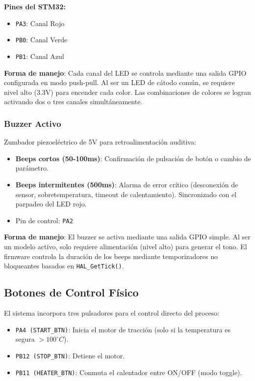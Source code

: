 \documentclass[12pt]{article}
\begin{document}
\textbf{Pines del STM32:}
\begin{itemize}
    \item \texttt{PA3}: Canal Rojo
    \item \texttt{PB0}: Canal Verde
    \item \texttt{PB1}: Canal Azul
\end{itemize}

\textbf{Forma de manejo}: Cada canal del LED se controla mediante una salida GPIO configurada en modo push-pull. Al ser un LED de cátodo común, se requiere nivel alto (3.3V) para encender cada color. Las combinaciones de colores se logran activando dos o tres canales simultáneamente.

\subsubsection{Buzzer Activo}
Zumbador piezoeléctrico de 5V para retroalimentación auditiva:
\begin{itemize}
    \item \textbf{Beeps cortos (50-100ms)}: Confirmación de pulsación de botón o cambio de parámetro.
    \item \textbf{Beeps intermitentes (500ms)}: Alarma de error crítico (desconexión de sensor, sobretemperatura, timeout de calentamiento). Sincronizado con el parpadeo del LED rojo.
    \item Pin de control: \texttt{PA2}
\end{itemize}

\textbf{Forma de manejo}: El buzzer se activa mediante una salida GPIO simple. Al ser un modelo activo, solo requiere alimentación (nivel alto) para generar el tono. El firmware controla la duración de los beeps mediante temporizadores no bloqueantes basados en \texttt{HAL\_GetTick()}.

\subsection{Botones de Control Físico}
El sistema incorpora tres pulsadores para el control directo del proceso:

\begin{itemize}
    \item \texttt{PA4 (START\_BTN)}: Inicia el motor de tracción (solo si la temperatura es segura $>100^\circ C$).
    \item \texttt{PB12 (STOP\_BTN)}: Detiene el motor.
    \item \texttt{PB11 (HEATER\_BTN)}: Conmuta el calentador entre ON/OFF (modo toggle).
\end{itemize}
\end{document}
